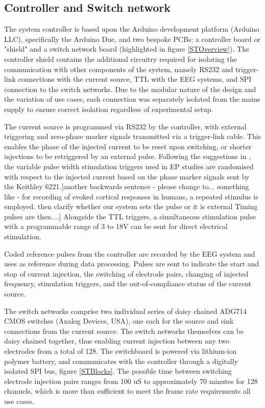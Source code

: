 \subsection{Controller and Switch network}

The system controller is based upon the Arduino development platform (Arduino LLC), specifically the Arduino Due, and two bespoke PCBs: a controller board or "shield" and a switch network board (highlighted in figure \ref{STOverview}). The controller shield contains the additional circuitry required for isolating the communication with other components of the system, namely RS232 and trigger-link connections with the current source, TTL with the EEG systems, and SPI connection to the switch networks. Due to the modular nature of the design and the variation of use cases, each connection was separately isolated from the mains supply to ensure correct isolation regardless of experimental setup.

The current source is programmed via RS232 by the controller, with external triggering and zero-phase marker signals transmitted via a trigger-link cable. This enables the phase of the injected current to be reset upon switching, or shorter injections to be retriggered by an external pulse. Following the suggestions in \cite{Aristovich_2015}, the variable pulse width stimulation triggers used in EP studies are randomised with respect to the injected current based on the phase marker signals sent by the Keithley 6221.[another backwards sentence - please change to... something like - for recording of evoked cortical responses in humans, a repeated stimulus is employed. {then clarify whether our system sets the pulse or it is external} Timing pulses are then....] Alongside the TTL triggers, a simultaneous stimulation pulse with a programmable range of 3 to 18V can be sent for direct electrical stimulation.

Coded reference pulses from the controller are recorded by the EEG system and uses as reference during data processing. Pulses are sent to indicate the start and stop of current injection, the switching of electrode pairs, changing of injected frequency, stimulation triggers, and the out-of-compliance status of the current source. 

The switch networks comprise two individual series of daisy chained ADG714 CMOS switches (Analog Devices, USA), one each for the source and sink connections from the current source. The switch networks themselves can be daisy chained together, thus enabling current injection between any two electrodes from a total of 128. The switchboard is powered via lithium-ion polymer battery, and communicates with the controller through a digitally isolated SPI bus, figure \ref{STBlocks}. The possible time between switching electrode injection pairs ranges from 100 uS to approximately 70 minutes for 128 channels, which is more than sufficient to meet the frame rate requirements all use cases. 

